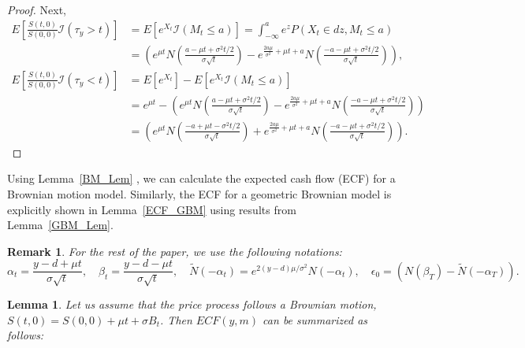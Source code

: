 \documentclass[11pt]{article}
\theoremstyle{plain}
\numberwithin{equation}{section}
\newtheorem{lem}[thm]{Lemma}
\newtheorem{remk}{Remark}
\newtheorem{remark}[theorem]{Remark}
\newcommand{\Red}{\color{Red}}
\begin{document}
{{\begin{proof}
{Next, 
\begin{align*}
	E\left[\frac{S(t,0)}{S(0,0)} \mathcal{I}(\tau_y>t)\right]
	&=E[e^{X_t}\mathcal{I}(M_t\leq a)]=\int_{-\infty}^{a} e^z P(X_t\in dz, M_t\leq a)\\
	&= \left( e^{\mu t} N\left( \frac{a-\mu t +\sigma^2t/2 }{\sigma\sqrt{t}} \right)-e^{\frac{2a\mu}{\sigma^2}+\mu t + a}N\left(\frac{-a-\mu t +\sigma^2 t/2}{\sigma\sqrt{t}} \right)  \right),\\
	E\left[\frac{S(t,0)}{S(0,0)} \mathcal{I}(\tau_y<t)\right]
	&=E[e^{X_t}] - E[e^{X_t}\mathcal{I}(M_t\leq a)]\\
	&= e^{\mu t}- \left( e^{\mu t} N\left( \frac{a-\mu t +\sigma^2t/2 }{\sigma\sqrt{t}} \right)-e^{\frac{2a\mu}{\sigma^2}+\mu t + a}N\left(\frac{-a-\mu t +\sigma^2 t/2}{\sigma\sqrt{t}} \right)  \right)\\
	&= \left( e^{\mu t} N\left( \frac{-a+\mu t -\sigma^2t/2 }{\sigma\sqrt{t}} \right)+e^{\frac{2a\mu}{\sigma^2}+\mu t + a}N\left(\frac{-a-\mu t +\sigma^2 t/2}{\sigma\sqrt{t}} \right)  \right).
\end{align*}


	
	
}
\end{proof}



{
Using Lemma~\ref{BM_Lem} , we can calculate the expected cash flow (ECF) for a Brownian motion model. Similarly, the ECF for a geometric Brownian model is explicitly shown in Lemma~\ref{ECF_GBM} using results from Lemma~\ref{GBM_Lem}. 
}
{\Red
\begin{remk}\label{Remk:notation_alphas}
	For the rest of the paper, we use the following notations:
	\[
\alpha_t= \frac{y-d+\mu t}{\sigma \sqrt{t}},
\quad
\beta_t = \frac{y-d-\mu t}{\sigma\sqrt{t}},
\quad \tilde{N}(-\alpha_t)= e^{2(y-d)\mu/\sigma^2}N(-\alpha_t),
\quad
\epsilon_0= \left(N\left(\beta_{T} \right)-\tilde{N}\left(-\alpha_{T}\right) \right).
\]
\end{remk}
}

{\Red 
\begin{lem}\label{ECF_BM}
	 Let us assume that the price process follows a Brownian motion, $S(t,0)=S(0,0)+\mu t +\sigma B_t$. Then $ECF(y,m)$ can be summarized as follows:
 

\end{lem}}}}
\end{document}
